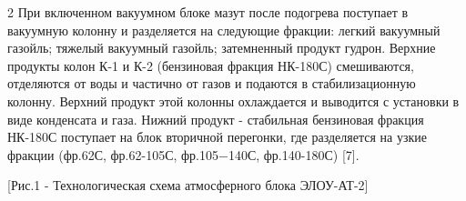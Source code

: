 \begin{multicols}{2}
При включенном вакуумном блоке мазут после подогрева поступает в
вакуумную колонну и разделяется на следующие фракции: легкий вакуумный
газойль; тяжелый вакуумный газойль; затемненный продукт гудрон. Верхние
продукты колон К-1 и К-2 (бензиновая фракция НК-180С)
смешиваются, отделяются от воды и частично от газов и подаются в
стабилизационную колонну. Верхний продукт этой колонны охлаждается и
выводится с установки в виде конденсата и газа. Нижний продукт -
стабильная бензиновая фракция НК-180С поступает на
блок вторичной перегонки, где разделяется на узкие фракции
(фр.62С, фр.62-105С,
фр.105−140С, фр.140-180С) {[}7{]}.
\end{multicols}

[Рис.1 - Технологическая схема атмосферного блока ЭЛОУ-АТ-2]

